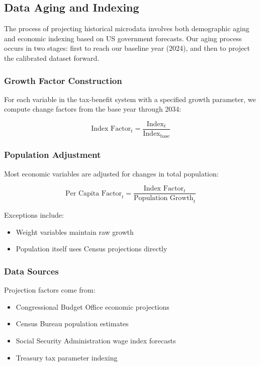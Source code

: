 \subsection{Data Aging and Indexing}

The process of projecting historical microdata involves both demographic aging and economic indexing based on US government forecasts. Our aging process occurs in two stages: first to reach our baseline year (2024), and then to project the calibrated dataset forward.

\subsubsection{Growth Factor Construction}

For each variable in the tax-benefit system with a specified growth parameter, we compute change factors from the base year through 2034:

\[ \text{Index Factor}_{t} = \frac{\text{Index}_{t}}{\text{Index}_{\text{base}}} \]

\subsubsection{Population Adjustment}

Most economic variables are adjusted for changes in total population:

\[ \text{Per Capita Factor}_{t} = \frac{\text{Index Factor}_{t}}{\text{Population Growth}_{t}} \]

Exceptions include:
\begin{itemize}
    \item Weight variables maintain raw growth
    \item Population itself uses Census projections directly
\end{itemize}

\subsubsection{Data Sources}

Projection factors come from:
\begin{itemize}
    \item Congressional Budget Office economic projections
    \item Census Bureau population estimates 
    \item Social Security Administration wage index forecasts
    \item Treasury tax parameter indexing
\end{itemize}


